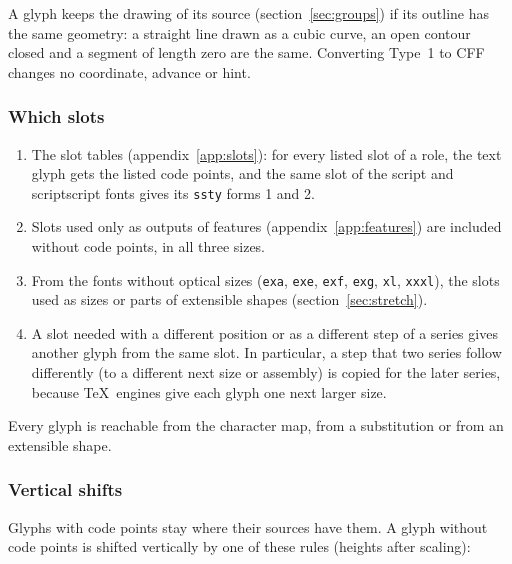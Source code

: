 \documentclass[10pt]{article}
\newcommand\code[1]{\texttt{#1}}
\newcommand\feat[1]{\texttt{#1}}
\begin{document}
A glyph keeps the drawing of its source (section~\ref{sec:groups}) if
its outline has the same geometry: a straight line drawn as a cubic
curve, an open contour closed and a segment of length zero are the
same.  Converting Type~1 to CFF changes no coordinate, advance or hint.

\subsubsection{Which slots}\label{sec:which}

\begin{enumerate}
\item The slot tables (appendix~\ref{app:slots}): for every listed slot
  of a role, the text glyph gets the listed code points, and the same
  slot of the script and scriptscript fonts gives its \feat{ssty}
  forms 1 and 2.
\item Slots used only as outputs of features
  (appendix~\ref{app:features}) are included without code points, in
  all three sizes.
\item From the fonts without optical sizes (\code{exa}, \code{exe},
  \code{exf}, \code{exg}, \code{xl}, \code{xxxl}), the slots used as
  sizes or parts of extensible shapes (section~\ref{sec:stretch}).
\item A slot needed with a different position or as a different step
  of a series gives another glyph from the same slot.  In particular,
  a step that two series follow differently (to a different next size
  or assembly) is copied for the later series, because \TeX\ engines
  give each glyph one next larger size.
\end{enumerate}

Every glyph is reachable from the character map, from a substitution
or from an extensible shape.

\subsubsection{Vertical shifts}\label{sec:vshift}

Glyphs with code points stay where their sources have them.  A glyph
without code points is shifted vertically by one of these rules
(heights after scaling):
\end{document}
